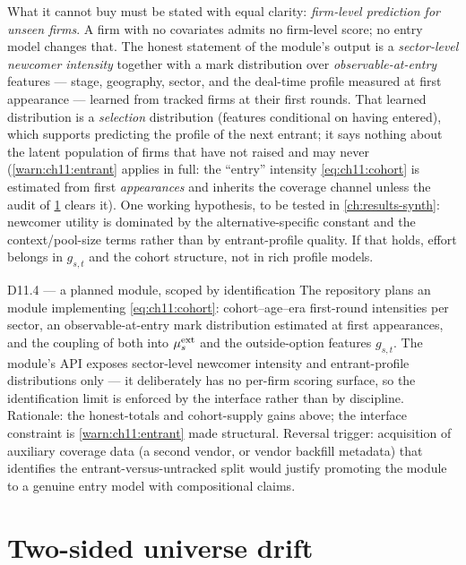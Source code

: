 What it cannot buy must be stated with equal clarity: \emph{firm-level
prediction for unseen firms}. A firm with no covariates admits no
firm-level score; no entry model changes that. The honest statement of
the module's output is a \emph{sector-level newcomer intensity} together
with a mark distribution over \emph{observable-at-entry} features ---
stage, geography, sector, and the deal-time profile measured at first
appearance --- learned from tracked firms at their first rounds. That
learned distribution is a \emph{selection} distribution (features
conditional on having entered), which supports predicting the profile of
the next entrant; it says nothing about the latent population of firms
that have not raised and may never (\cref{warn:ch11:entrant} applies in
full: the ``entry'' intensity \cref{eq:ch11:cohort} is estimated from
first \emph{appearances} and inherits the coverage channel unless the
audit of \cref{ch11:sec:drift} clears it). One working hypothesis, to
be tested in \cref{ch:results-synth}: newcomer utility is dominated by
the alternative-specific constant and the context/pool-size terms
rather than by entrant-profile quality. If that holds, effort belongs
in $g_{s,t}$ and the cohort structure, not in rich profile models.

\begin{decision}{D11.4 --- a planned  module, scoped by identification}
The repository plans an  module implementing
\cref{eq:ch11:cohort}: cohort--age--era first-round intensities per
sector, an observable-at-entry mark distribution estimated at first
appearances, and the coupling of both into
$\mu_s^{\mathrm{ext}}$ and the outside-option features $g_{s,t}$. The
module's API exposes sector-level newcomer intensity and entrant-profile
distributions only --- it deliberately has no per-firm scoring surface,
so the identification limit is enforced by the interface rather than by
discipline. Rationale: the honest-totals and cohort-supply gains above;
the interface constraint is \cref{warn:ch11:entrant} made structural.
Reversal trigger: acquisition of auxiliary coverage data (a second
vendor, or vendor backfill metadata) that identifies the
entrant-versus-untracked split would justify promoting the module to a
genuine entry model with compositional claims.
\end{decision}

\section{Two-sided universe drift}\label{ch11:sec:drift}


